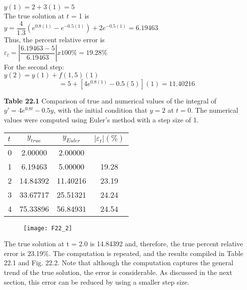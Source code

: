 \documentclass[../main.tex]{subfiles}
\begin{document}
$y(1) = 2 + 3(1) = 5$\\

The true solution at $t$ = 1 is\\

$y=\dfrac{4}{1.3} \left(e^{0.8(1)} - e^{-0.5(1)} \right) + 2e^{-0.5(1)} = 6.19463$\\

Thus, the percent relative error is\\

$\varepsilon_{t} = \left| \dfrac{6.19463 - 5}{6.19463} \right| x 100 \% = 19.28 \% $\\

For the second step:\\

$y(2) = y(1) + f(1,5)(1)$
$$= 5 + [4e^{0.8(1)} - 0.5(5)](1) = 11.40216 $$


\vspace{0,3in}
\textbf{Table 22.1}
Comparison of true and numerical values of the integral
of $y' = 4e^{0.8t} - 0.5y$, with the initial condition that $y = 2$ at $t = 0$. The numerical values were computed using Euler's
method with a step size of 1.\\
\begin{tabular}{lccc}
\hline

	\textbf{$t$} \; \; \; \; \; & \textbf{$y_{true}$} \; \; \; \; \; & \textbf{$y_{Euler}$} \; \; \; \; \; &  \textbf{$\left|\varepsilon_{t}\right|( \% )$}\\
	
\hline

	0 \; \; \; \; \; & 2.00000 \; \; \; \; \; & 2.00000 \; \; \; \; \; & \vspace{0in}\\
	
	1 \; \; \; \; \; & 6.19463 \; \; \; \; \; & 5.00000 \; \; \; \; \; & 19.28\\

	2 \; \; \; \; \; & 14.84392 \; \; \; \; \; & 11.40216 \; \; \; \; \; & 23.19\\

	3 \; \; \; \; \; & 33.67717 \; \; \; \; \; & 25.51321 \; \; \; \; \; & 24.24\\

	4 \; \; \; \; \; & 75.33896 \; \; \; \; \; & 56.84931 \; \; \; \; \; & 24.54\\

\hline
\end{tabular}


\begin{figure}[hbt!]
	\texttt{[image: F22\_2]}
	\label{F22.2}
\end{figure}
The true solution at t = 2.0 is 14.84392 and, therefore, the true percent relative error is
23.19\%. The computation is repeated, and the results compiled in Table 22.1 and Fig. 22.2.
Note that although the computation captures the general trend of the true solution, the error
is considerable. As discussed in the next section, this error can be reduced by using a
smaller step size.
\end{document}

